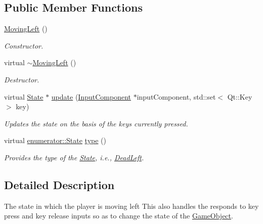 \subsection*{Public Member Functions}
\begin{DoxyCompactItemize}
\item 
\hypertarget{classMovingLeft_a8a89983c75d13fa11e54299944ac79db}{\hyperlink{classMovingLeft_a8a89983c75d13fa11e54299944ac79db}{Moving\-Left} ()}\label{classMovingLeft_a8a89983c75d13fa11e54299944ac79db}

\begin{DoxyCompactList}\small\item\em Constructor. \end{DoxyCompactList}\item 
\hypertarget{classMovingLeft_a01d8becd5f957652c3a2e6e69d261bf1}{virtual \hyperlink{classMovingLeft_a01d8becd5f957652c3a2e6e69d261bf1}{$\sim$\-Moving\-Left} ()}\label{classMovingLeft_a01d8becd5f957652c3a2e6e69d261bf1}

\begin{DoxyCompactList}\small\item\em Destructor. \end{DoxyCompactList}\item 
virtual \hyperlink{classState}{State} $\ast$ \hyperlink{classMovingLeft_a0ddbc7a065b820e06caa76c650ab6765}{update} (\hyperlink{classInputComponent}{Input\-Component} $\ast$input\-Component, std\-::set$<$ Qt\-::\-Key $>$ key)
\begin{DoxyCompactList}\small\item\em Updates the state on the basis of the keys currently pressed. \end{DoxyCompactList}\item 
virtual \hyperlink{namespaceenumerator_a5fc7b342c2c633e1037b07cea237a222}{enumerator\-::\-State} \hyperlink{classMovingLeft_a2bf0f28568b5188d4b9bad622b52e47d}{type} ()
\begin{DoxyCompactList}\small\item\em Provides the type of the \hyperlink{classState}{State}, i.\-e., \hyperlink{classDeadLeft}{Dead\-Left}. \end{DoxyCompactList}\end{DoxyCompactItemize}


\subsection{Detailed Description}
The state in which the player is moving left This also handles the responds to key press and key release inputs so as to change the state of the \hyperlink{classGameObject}{Game\-Object}. 

